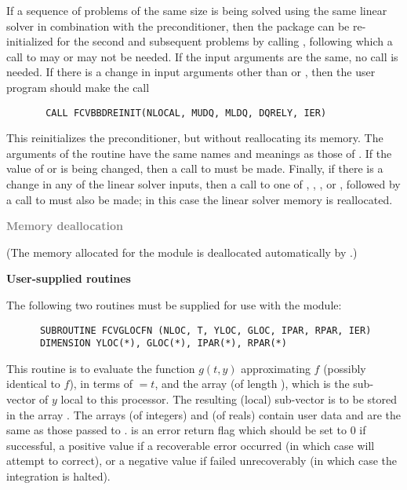 \begin{Steps}
  If a sequence of problems of the same size is being solved using the same
  linear solver in combination with the {\cvbbdpre} preconditioner,
  then the {\cvode} package can be re-initialized for the second and
  subsequent problems by calling , following which a
  call to  may or may not be needed.  If the input
  arguments are the same, no  call is needed. If there
  is a change in input arguments other than  or , then
  the user program should make the call  
\begin{verbatim}
       CALL FCVBBDREINIT(NLOCAL, MUDQ, MLDQ, DQRELY, IER)
\end{verbatim}
  This reinitializes the {\cvbbdpre} preconditioner, but without
  reallocating its memory.  The arguments of the 
  routine have the same names and meanings as those of .
  If the value of  or  is being changed, then a call to
   must be made.  Finally, if there is a change in any of the
  linear solver inputs, then a call to one of ,
  , ,  or
  , followed by a call to  must
  also be made; in this case the linear solver memory is reallocated.
  
\item \textcolor{gray}{\bf Memory deallocation}

  (The memory allocated for the {\fcvbbd} module is deallocated automatically
  by .)


\item {\bf User-supplied routines}

  The following two routines must be supplied for use with the {\cvbbdpre}
  module:
\begin{verbatim}
      SUBROUTINE FCVGLOCFN (NLOC, T, YLOC, GLOC, IPAR, RPAR, IER)
      DIMENSION YLOC(*), GLOC(*), IPAR(*), RPAR(*)
\end{verbatim}
  This routine is to evaluate the function $g(t,y)$ approximating $f$
  (possibly identical to $f$), in terms of  $ = t$, and the array
   (of length ), which is the sub-vector
  of $y$ local to this processor.  The resulting (local) sub-vector
  is to be stored in the array .
  The arrays  (of integers) and  (of reals) contain user data
  and are the same as those passed to .
   is an error return flag which should be set to $0$ if successful, 
  a positive value if a recoverable error occurred (in which case {\cvode} will 
  attempt to correct), or a negative value if  failed unrecoverably 
  (in which case the integration is halted).


\end{Steps}
